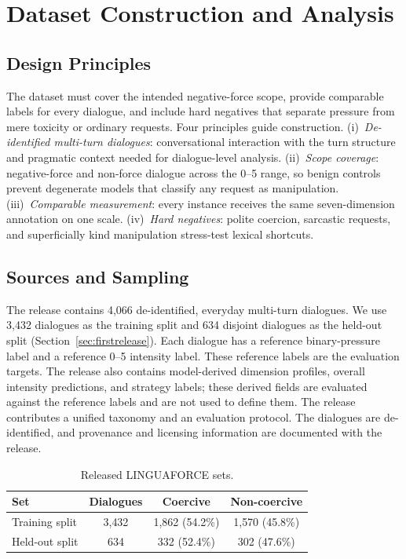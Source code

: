 \documentclass[conference]{IEEEtran}
\newcommand{\LNGF}{LINGUAFORCE}
\begin{document}
\section{Dataset Construction and Analysis}
\label{sec:dataset}
\subsection{Design Principles}
The dataset must cover the intended negative-force scope, provide comparable
labels for every dialogue, and include hard negatives that separate pressure
from mere toxicity or ordinary requests.
Four principles guide construction. (i)~\emph{De-identified multi-turn
dialogues}: conversational interaction with the turn structure and pragmatic
context needed for dialogue-level analysis.
(ii)~\emph{Scope coverage}: negative-force and non-force dialogue across
the 0--5 range, so benign controls prevent degenerate models that classify
any request as manipulation. (iii)~\emph{Comparable measurement}: every
instance receives the same seven-dimension annotation on one scale.
(iv)~\emph{Hard negatives}: polite coercion, sarcastic requests, and
superficially kind manipulation stress-test lexical shortcuts.

\subsection{Sources and Sampling}
The release contains 4{,}066 de-identified, everyday multi-turn dialogues.
We use 3{,}432 dialogues as the training split and 634 disjoint dialogues as
the held-out split (Section~\ref{sec:firstrelease}). Each dialogue has a
reference binary-pressure label and a reference 0--5 intensity label. These
reference labels are the evaluation targets. The release also contains
model-derived dimension profiles, overall intensity predictions, and strategy
labels; these derived fields are evaluated against the reference labels and
are not used to define them. The release contributes a unified taxonomy and
an evaluation protocol. The dialogues are de-identified, and provenance and
licensing information are documented with the release.

\begin{table}[t]
\centering
\caption{Released \LNGF{} sets.}
\label{tab:dataset}
\footnotesize
\begin{tabular}{@{}lccc@{}}
\toprule
\textbf{Set} & \textbf{Dialogues} & \textbf{Coercive} & \textbf{Non-coercive}\\
\midrule
Training split & 3{,}432 & 1{,}862 (54.2\%) & 1{,}570 (45.8\%)\\
Held-out split & 634 & 332 (52.4\%) & 302 (47.6\%)\\
\bottomrule
\end{tabular}
\end{table}
\end{document}
